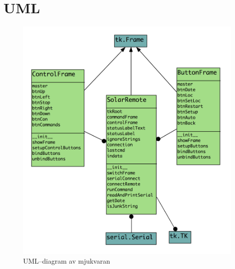 \documentclass{article}
\begin{document}
        \section{UML}
            \begin{figure}[h!]
                \centering
                \includegraphics[scale=0.4]{img/uml}
                \caption{UML--diagram av mjukvaran}
                \label{fig:uml}
            \end{figure}
\end{document}
